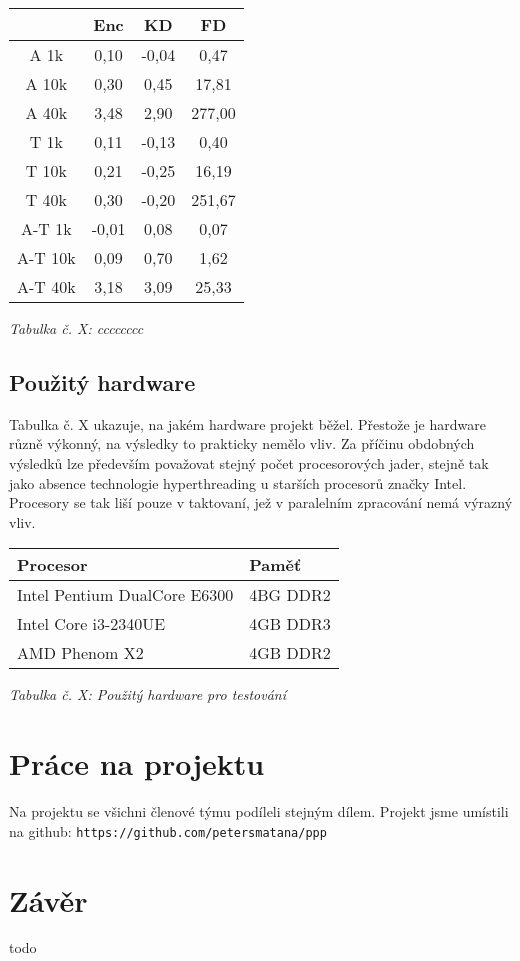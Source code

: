 \documentclass{article}
\begin{document}
\begin{center}
	\begin{tabular}{ c | c | c | c }
		 & Enc & KD & FD \\
		\hline
		A 1k & 0,10 & -0,04 & 0,47 \\
		\hline
		A 10k & 0,30 & 0,45 & 17,81 \\
		\hline
		A 40k & 3,48 & 2,90 & 277,00 \\
		\hline
		T 1k & 0,11 & -0,13 & 0,40 \\
		\hline
		T 10k & 0,21 & -0,25 & 16,19 \\
		\hline
		T 40k & 0,30 & -0,20 & 251,67 \\
		\hline
		A-T 1k & -0,01 & 0,08 & 0,07 \\
		\hline
		A-T 10k & 0,09 & 0,70 & 1,62 \\
		\hline
		A-T 40k & 3,18 & 3,09 & 25,33 \\
	\end{tabular}
	\newline
	\textit{Tabulka č. X: cccccccc}
\end{center}


\subsection{Použitý hardware}
Tabulka č. X ukazuje, na jakém hardware projekt běžel. Přestože je hardware
různě výkonný, na výsledky to prakticky nemělo vliv. Za příčinu obdobných
výsledků lze především považovat stejný počet procesorových jader, stejně
tak jako absence technologie hyperthreading u starších procesorů značky Intel.
Procesory se tak liší pouze v taktovaní, jež v paralelním zpracování nemá výrazný vliv.
\newline
\begin{center}
	\begin{tabular}{ l | l }
		\textbf{Procesor} & \textbf{Paměť} \\
		\hline
		\hline
		Intel Pentium DualCore E6300 & 4BG DDR2 \\
		\hline
		Intel Core i3-2340UE & 4GB DDR3 \\
		\hline
		AMD Phenom X2 & 4GB DDR2 \\
	\end{tabular}
	\newline
	\textit{Tabulka č. X: Použitý hardware pro testování}
\end{center}

\section{Práce na projektu}
Na projektu se všichni členové týmu podíleli stejným dílem. Projekt jsme
umístili na github: \texttt{https://github.com/petersmatana/ppp}

\section{Závěr}
{\color{red}todo}
\end{document}
